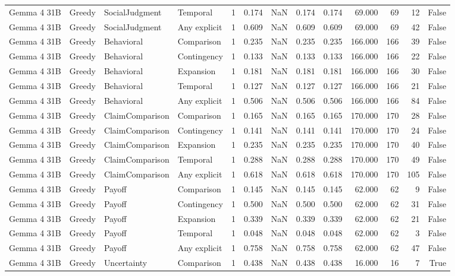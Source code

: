 \begin{tabular}{llllrrrrrrrrr}
Gemma 4 31B & Greedy & SocialJudgment & Temporal & 1 & 0.174 & NaN & 0.174 & 0.174 & 69.000 & 69 & 12 & False \\
Gemma 4 31B & Greedy & SocialJudgment & Any explicit & 1 & 0.609 & NaN & 0.609 & 0.609 & 69.000 & 69 & 42 & False \\
Gemma 4 31B & Greedy & Behavioral & Comparison & 1 & 0.235 & NaN & 0.235 & 0.235 & 166.000 & 166 & 39 & False \\
Gemma 4 31B & Greedy & Behavioral & Contingency & 1 & 0.133 & NaN & 0.133 & 0.133 & 166.000 & 166 & 22 & False \\
Gemma 4 31B & Greedy & Behavioral & Expansion & 1 & 0.181 & NaN & 0.181 & 0.181 & 166.000 & 166 & 30 & False \\
Gemma 4 31B & Greedy & Behavioral & Temporal & 1 & 0.127 & NaN & 0.127 & 0.127 & 166.000 & 166 & 21 & False \\
Gemma 4 31B & Greedy & Behavioral & Any explicit & 1 & 0.506 & NaN & 0.506 & 0.506 & 166.000 & 166 & 84 & False \\
Gemma 4 31B & Greedy & ClaimComparison & Comparison & 1 & 0.165 & NaN & 0.165 & 0.165 & 170.000 & 170 & 28 & False \\
Gemma 4 31B & Greedy & ClaimComparison & Contingency & 1 & 0.141 & NaN & 0.141 & 0.141 & 170.000 & 170 & 24 & False \\
Gemma 4 31B & Greedy & ClaimComparison & Expansion & 1 & 0.235 & NaN & 0.235 & 0.235 & 170.000 & 170 & 40 & False \\
Gemma 4 31B & Greedy & ClaimComparison & Temporal & 1 & 0.288 & NaN & 0.288 & 0.288 & 170.000 & 170 & 49 & False \\
Gemma 4 31B & Greedy & ClaimComparison & Any explicit & 1 & 0.618 & NaN & 0.618 & 0.618 & 170.000 & 170 & 105 & False \\
Gemma 4 31B & Greedy & Payoff & Comparison & 1 & 0.145 & NaN & 0.145 & 0.145 & 62.000 & 62 & 9 & False \\
Gemma 4 31B & Greedy & Payoff & Contingency & 1 & 0.500 & NaN & 0.500 & 0.500 & 62.000 & 62 & 31 & False \\
Gemma 4 31B & Greedy & Payoff & Expansion & 1 & 0.339 & NaN & 0.339 & 0.339 & 62.000 & 62 & 21 & False \\
Gemma 4 31B & Greedy & Payoff & Temporal & 1 & 0.048 & NaN & 0.048 & 0.048 & 62.000 & 62 & 3 & False \\
Gemma 4 31B & Greedy & Payoff & Any explicit & 1 & 0.758 & NaN & 0.758 & 0.758 & 62.000 & 62 & 47 & False \\
Gemma 4 31B & Greedy & Uncertainty & Comparison & 1 & 0.438 & NaN & 0.438 & 0.438 & 16.000 & 16 & 7 & True \\

\end{tabular}
